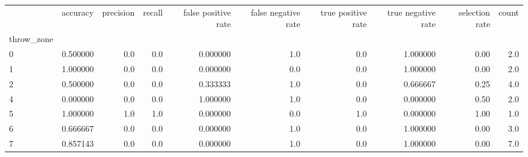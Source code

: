 \begin{tabular}{lrrrrrrrrr}
\toprule
{} &  accuracy &  precision &  recall &  false positive rate &  false negative rate &  true positive rate &  true negative rate &  selection rate &  count \\
throw\_zone &           &            &         &                      &                      &                     &                     &                 &        \\
\midrule
0          &  0.500000 &        0.0 &     0.0 &             0.000000 &                  1.0 &                 0.0 &            1.000000 &            0.00 &    2.0 \\
1          &  1.000000 &        0.0 &     0.0 &             0.000000 &                  0.0 &                 0.0 &            1.000000 &            0.00 &    2.0 \\
2          &  0.500000 &        0.0 &     0.0 &             0.333333 &                  1.0 &                 0.0 &            0.666667 &            0.25 &    4.0 \\
4          &  0.000000 &        0.0 &     0.0 &             1.000000 &                  1.0 &                 0.0 &            0.000000 &            0.50 &    2.0 \\
5          &  1.000000 &        1.0 &     1.0 &             0.000000 &                  0.0 &                 1.0 &            0.000000 &            1.00 &    1.0 \\
6          &  0.666667 &        0.0 &     0.0 &             0.000000 &                  1.0 &                 0.0 &            1.000000 &            0.00 &    3.0 \\
7          &  0.857143 &        0.0 &     0.0 &             0.000000 &                  1.0 &                 0.0 &            1.000000 &            0.00 &    7.0 \\
\bottomrule
\end{tabular}
